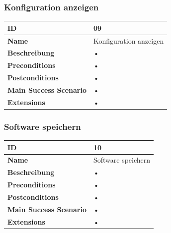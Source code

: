 \subsubsection{Konfiguration anzeigen}
\mbox{}
\begin{longtable}{| p{4cm} | p{11.7cm} |}
 \hline
 \textbf{ID} & 09\\ \hline 
 \textbf{Name} & Konfiguration anzeigen\\ \hline 
 \textbf{Beschreibung} & • \\ \hline 
 \textbf{Preconditions} & • \\ \hline 
 \textbf{Postconditions} & • \\ \hline 
 \textbf{Main Success Scenario} & • \\ \hline 
 \textbf{Extensions} & • \\ \hline 
 \end{longtable}
 
\subsubsection{Software speichern}
\mbox{}
\begin{longtable}{| p{4cm} | p{11.7cm} |}
 \hline
 \textbf{ID} & 10\\ \hline 
 \textbf{Name} & Software speichern\\ \hline 
 \textbf{Beschreibung} & • \\ \hline 
 \textbf{Preconditions} & • \\ \hline 
 \textbf{Postconditions} & • \\ \hline 
 \textbf{Main Success Scenario} & • \\ \hline 
 \textbf{Extensions} & • \\ \hline 
 \end{longtable}
 
